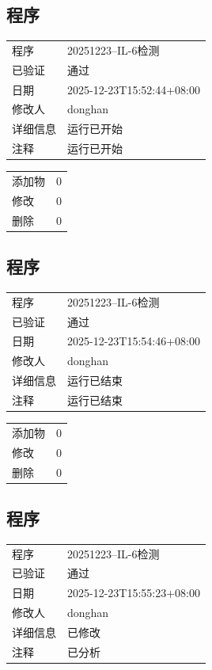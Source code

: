 \documentclass[UTF8,10pt,a4paper,fontset=fandol]{ctexart}
\begin{document}
\subsection*{程序}

\begin{tabular}{@{}ll@{}}
程序 & 20251223--IL-6检测\\
已验证 & 通过\\
日期 & 2025-12-23T15:52:44+08:00\\
修改人 & donghan\\
详细信息 & 运行已开始\\
注释 & 运行已开始\\
\end{tabular}

\medskip
\begin{tabular}{@{}ll@{}}
添加物 & 0\\
修改 & 0\\
删除 & 0\\
\end{tabular}

\subsection*{程序}

\begin{tabular}{@{}ll@{}}
程序 & 20251223--IL-6检测\\
已验证 & 通过\\
日期 & 2025-12-23T15:54:46+08:00\\
修改人 & donghan\\
详细信息 & 运行已结束\\
注释 & 运行已结束\\
\end{tabular}

\medskip
\begin{tabular}{@{}ll@{}}
添加物 & 0\\
修改 & 0\\
删除 & 0\\
\end{tabular}

\subsection*{程序}

\begin{tabular}{@{}ll@{}}
程序 & 20251223--IL-6检测\\
已验证 & 通过\\
日期 & 2025-12-23T15:55:23+08:00\\
修改人 & donghan\\
详细信息 & 已修改\\
注释 & 已分析\\
\end{tabular}
\end{document}
